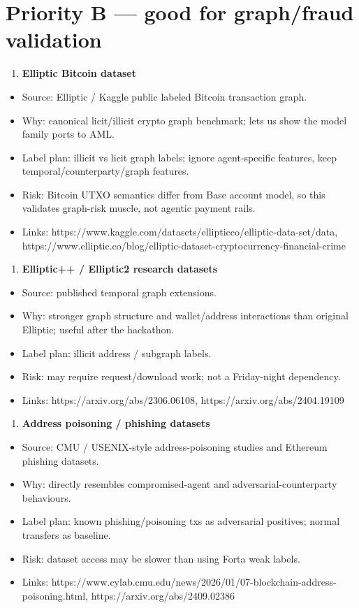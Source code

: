 \documentclass[11pt]{article}
\begin{document}
\section{Priority B --- good for graph/fraud validation}
\begin{enumerate}
  \item \textbf{Elliptic Bitcoin dataset}
\end{enumerate}
\begin{itemize}
  \item Source: Elliptic / Kaggle public labeled Bitcoin transaction graph.
  \item Why: canonical licit/illicit crypto graph benchmark; lets us show the model family ports to AML.
  \item Label plan: illicit vs licit graph labels; ignore agent-specific features, keep temporal/counterparty/graph features.
  \item Risk: Bitcoin UTXO semantics differ from Base account model, so this validates graph-risk muscle, not agentic payment rails.
  \item Links: https://www.kaggle.com/datasets/ellipticco/elliptic-data-set/data, https://www.elliptic.co/blog/elliptic-dataset-cryptocurrency-financial-crime
\end{itemize}
\begin{enumerate}
  \item \textbf{Elliptic++ / Elliptic2 research datasets}
\end{enumerate}
\begin{itemize}
  \item Source: published temporal graph extensions.
  \item Why: stronger graph structure and wallet/address interactions than original Elliptic; useful after the hackathon.
  \item Label plan: illicit address / subgraph labels.
  \item Risk: may require request/download work; not a Friday-night dependency.
  \item Links: https://arxiv.org/abs/2306.06108, https://arxiv.org/abs/2404.19109
\end{itemize}
\begin{enumerate}
  \item \textbf{Address poisoning / phishing datasets}
\end{enumerate}
\begin{itemize}
  \item Source: CMU / USENIX-style address-poisoning studies and Ethereum phishing datasets.
  \item Why: directly resembles compromised-agent and adversarial-counterparty behaviours.
  \item Label plan: known phishing/poisoning txs as adversarial positives; normal transfers as baseline.
  \item Risk: dataset access may be slower than using Forta weak labels.
  \item Links: https://www.cylab.cmu.edu/news/2026/01/07-blockchain-address-poisoning.html, https://arxiv.org/abs/2409.02386
\end{itemize}
\end{document}
